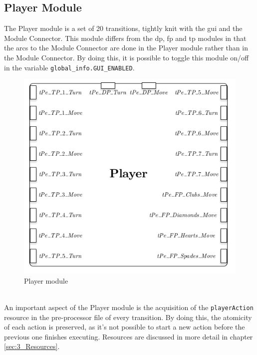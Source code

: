 \documentclass[runningheads,a4paper]{llncs}
\begin{document}
\subsection{Player Module}
The Player module is a set of 20 transitions, tightly knit with the \ac{gui} and the Module Connector. This module differs from the \ac{dp}, \ac{fp} and \ac{tp} modules in that the arcs to the Module Connector are done in the Player module rather than in the Module Connector. By doing this, it is possible to toggle this module on/off in the variable \verb!global_info.GUI_ENABLED!.
\begin{figure}
	\begin{center}
		\includegraphics[width=\textwidth]{images/playerModule}
		\caption{Player module}
		\label{fig:player_module}
	\end{center}
\end{figure}\\
An important aspect of the Player module is the acquisition of the \verb!playerAction! resource in the pre-processor file of every transition. By doing this, the atomicity of each action is preserved, as it's not possible to start a new action before the previous one finishes executing. Resources are discussed in more detail in chapter \ref{sec:3_Resources}.\\
\end{document}
